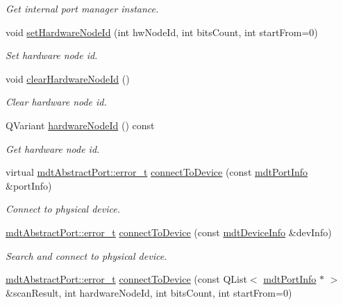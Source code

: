 \begin{DoxyCompactItemize}
\begin{DoxyCompactList}\small\item\em Get internal port manager instance. \end{DoxyCompactList}\item 
void \hyperlink{classmdt_device_modbus_a64bfa566dbd8511e11d76c0b14191f17}{setHardwareNodeId} (int hwNodeId, int bitsCount, int startFrom=0)
\begin{DoxyCompactList}\small\item\em Set hardware node id. \end{DoxyCompactList}\item 
void \hyperlink{classmdt_device_modbus_a4ec2b55127b7b853488f102f2c5215f8}{clearHardwareNodeId} ()
\begin{DoxyCompactList}\small\item\em Clear hardware node id. \end{DoxyCompactList}\item 
QVariant \hyperlink{classmdt_device_modbus_ab5e3f041a24d895dbe739a9229d4fd27}{hardwareNodeId} () const 
\begin{DoxyCompactList}\small\item\em Get hardware node id. \end{DoxyCompactList}\item 
virtual \hyperlink{classmdt_abstract_port_ad4121bb930c95887e77f8bafa065a85e}{mdtAbstractPort::error\_\-t} \hyperlink{classmdt_device_modbus_a3ca2a84163fed1380cbc8859a6b70db0}{connectToDevice} (const \hyperlink{classmdt_port_info}{mdtPortInfo} \&portInfo)
\begin{DoxyCompactList}\small\item\em Connect to physical device. \end{DoxyCompactList}\item 
\hyperlink{classmdt_abstract_port_ad4121bb930c95887e77f8bafa065a85e}{mdtAbstractPort::error\_\-t} \hyperlink{classmdt_device_modbus_a093c6407ee69c4c7696a0c71d0acd88d}{connectToDevice} (const \hyperlink{classmdt_device_info}{mdtDeviceInfo} \&devInfo)
\begin{DoxyCompactList}\small\item\em Search and connect to physical device. \end{DoxyCompactList}\item 
\hyperlink{classmdt_abstract_port_ad4121bb930c95887e77f8bafa065a85e}{mdtAbstractPort::error\_\-t} \hyperlink{classmdt_device_modbus_a323b16687f448a4e45eb0b313635b77f}{connectToDevice} (const QList$<$ \hyperlink{classmdt_port_info}{mdtPortInfo} $\ast$ $>$ \&scanResult, int hardwareNodeId, int bitsCount, int startFrom=0)

\end{DoxyCompactItemize}
